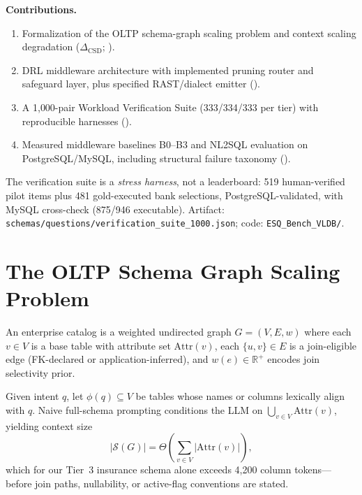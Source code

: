 \documentclass[twocolumn]{svjour3}
\begin{document}
\textbf{Contributions.}
\begin{enumerate}[label=(\arabic*)]
  \item Formalization of the OLTP schema-graph scaling problem and context scaling degradation ($\Delta_{\text{CSD}}$; ).
  \item DRL middleware architecture with implemented pruning router and safeguard layer, plus specified RAST/dialect emitter ().
  \item A 1{,}000-pair Workload Verification Suite (333/334/333 per tier) with reproducible harnesses ().
  \item Measured middleware baselines B0--B3 and NL2SQL evaluation on PostgreSQL/MySQL, including structural failure taxonomy ().
\end{enumerate}

The verification suite is a \emph{stress harness}, not a leaderboard: 519 human-verified pilot items plus 481 gold-executed bank selections, PostgreSQL-validated, with MySQL cross-check (875/946 executable).
Artifact: \texttt{schemas/questions/verification\_suite\_1000.json}; code: \texttt{ESQ\_Bench\_VLDB/}.

\section{The OLTP Schema Graph Scaling Problem}
\label{sec:problem}

\begin{drdef}
\label{def:graph}
An enterprise catalog is a weighted undirected graph $G=(V,E,w)$ where each $v\in V$ is a base table with attribute set $\text{Attr}(v)$, each $\{u,v\}\in E$ is a join-eligible edge (FK-declared or application-inferred), and $w(e)\in\mathbb{R}^+$ encodes join selectivity prior.
\end{drdef}

Given intent $q$, let $\phi(q)\subseteq V$ be tables whose names or columns lexically align with $q$.
Naive full-schema prompting conditions the LLM on $\bigcup_{v\in V}\text{Attr}(v)$, yielding context size
\begin{equation}
  |\mathcal{S}(G)| = \Theta\!\left(\sum_{v\in V} |\text{Attr}(v)|\right),
\end{equation}
which for our Tier~3 insurance schema alone exceeds 4{,}200 column tokens---before join paths, nullability, or active-flag conventions are stated.
\end{document}

